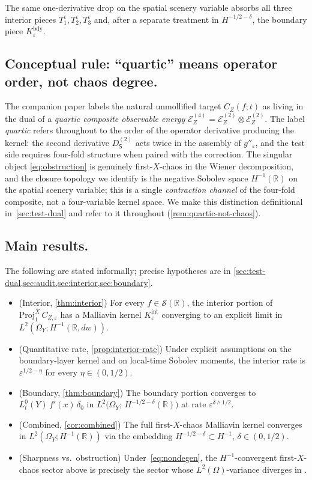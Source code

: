 \documentclass[11pt,reqno]{amsart}
\theoremstyle{plain}
\theoremstyle{definition}
\theoremstyle{remark}
\newcommand{\R}{\mathbb{R}}
\newcommand{\Energy}{\mathcal{E}}
\newcommand{\Source}{\mathsf{S}}
\newcommand{\IBM}{Z}
\begin{document}
The same one-derivative drop on the spatial scenery variable absorbs
all three interior pieces
$T_{1}^{\varepsilon},T_{2}^{\varepsilon},T_{3}^{\varepsilon}$ and,
after a separate treatment in $H^{-1/2-\delta}$, the boundary piece
$K_{\varepsilon}^{\mathrm{bdy}}$.

\subsection*{Conceptual rule: ``quartic'' means operator order, not chaos degree.}
The companion paper labels the natural unmollified target
$C_{\IBM}(f;t)$ as living in the dual of a \emph{quartic composite
observable energy}
$\Energy_{\IBM}^{(4)}=\Energy_{\IBM}^{(2)}\otimes\Energy_{\IBM}^{(2)}$.
The label \emph{quartic} refers throughout to the order of the
operator derivative producing the kernel: the second derivative
$D_{\Source}^{(2)}$ acts twice in the assembly of $g''_{\varepsilon}$,
and the test side requires four-fold structure when paired with the
correction. The singular object \eqref{eq:obstruction} is genuinely
first-$X$-chaos in the Wiener decomposition, and the closure topology
we identify is the negative Sobolev space $H^{-1}(\R)$ on the
spatial scenery variable; this is a single \emph{contraction channel}
of the four-fold composite, not a four-variable kernel space. We
make this distinction definitional in~\cref{sec:test-dual} and refer
to it throughout (\cref{rem:quartic-not-chaos}).

\subsection*{Main results.}
The following are stated informally; precise hypotheses are in
\cref{sec:test-dual,sec:audit,sec:interior,sec:boundary}.
\begin{itemize}
\item (Interior, \cref{thm:interior}) For every $f\in\mathscr S(\R)$,
the interior portion of $\mathrm{Proj}_{1}^{X}\,C_{\IBM,\varepsilon}$
has a Malliavin kernel $K_{\varepsilon}^{\mathrm{int}}$ converging to
an explicit limit in $L^{2}(\Omega_{Y};H^{-1}(\R,dw))$.
\item (Quantitative rate, \cref{prop:interior-rate}) Under explicit
assumptions on the boundary-layer kernel and on local-time Sobolev
moments, the interior rate is $\varepsilon^{1/2-\eta}$ for every
$\eta\in(0,1/2)$.
\item (Boundary, \cref{thm:boundary}) The boundary portion converges
to $L_{t}^{0}(Y)\,f'(x)\,\delta_{0}$ in
$L^{2}\bigl(\Omega_{Y};\,H^{-1/2-\delta}(\R)\bigr)$ at rate
$\varepsilon^{\delta\wedge 1/2}$.
\item (Combined, \cref{cor:combined}) The full first-$X$-chaos
Malliavin kernel converges in $L^{2}(\Omega_{Y};H^{-1}(\R))$ via
the embedding $H^{-1/2-\delta}\subset H^{-1}$,
$\delta\in(0,1/2)$.
\item (Sharpness vs.\ obstruction) Under~\eqref{eq:nondegen}, the
$H^{-1}$-convergent first-$X$-chaos sector above is precisely the
sector whose $L^{2}(\Omega)$-variance diverges in
\cite{Fontes-EnergyFirst}.
\end{itemize}
\end{document}

